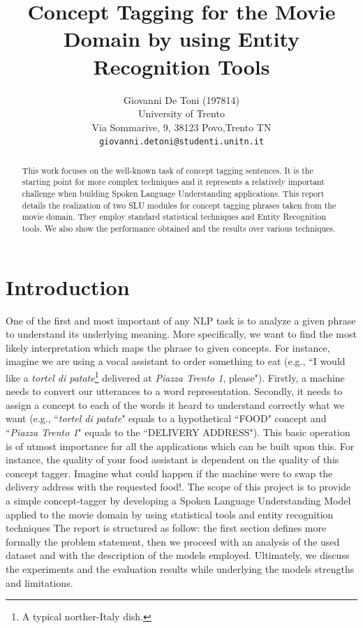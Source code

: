 \documentclass[11pt,a4paper]{article}
\title{Concept Tagging for the Movie Domain by using Entity Recognition Tools}
\author{Giovanni De Toni (197814) \\
  University of Trento \\ Via Sommarive, 9, 38123 Povo,Trento TN\\
  \texttt{giovanni.detoni@studenti.unitn.it}}
\date{}
\begin{document}
\maketitle

\begin{abstract}
This work focuses on the well-known task of concept tagging sentences.  It is the starting point for more complex techniques and it represents a relatively important challenge when building Spoken Language Understanding applications. This report details the realization of two SLU modules for concept tagging phrases taken from the movie domain. They employ standard statistical techniques and Entity Recognition tools. We also show the performance obtained and the results over various techniques.
\end{abstract}

\section{Introduction}
One of the first and most important of any NLP task is to analyze a given phrase to understand its underlying meaning. More specifically, we want to find the most likely interpretation which maps the phrase to given concepts. For instance, imagine we are using a vocal assistant to order something to eat (e.g., ``I would like a \textit{tortel di patate}\footnote{A typical norther-Italy dish.} delivered at \textit{Piazza Trento 1}, please"). Firstly, a machine needs to convert our utterances to a word representation. Secondly, it needs to assign a concept to each of the words it heard to understand correctly what we want (e.g., ``\textit{tortel di patate}" equals to a hypothetical ``FOOD" concept and ``\textit{Piazza Trento 1}" equals to the ``DELIVERY ADDRESS").
This basic operation is of utmost importance for all the applications which can be built upon this. For instance, the quality of your food assistant is dependent on the quality of this concept tagger. Imagine what could happen if the machine were to swap the delivery address with the requested food!.  
The scope of this project is to provide a simple concept-tagger by developing a Spoken Language Understanding Model applied to the movie domain by using statistical tools and entity recognition techniques
The report is structured as follow: the first section defines more formally the problem statement, then we proceed with an analysis of the used dataset and with the description of the models employed. Ultimately, we discuss the experiments and the evaluation results while underlying the models strengths and limitations.
\end{document}
